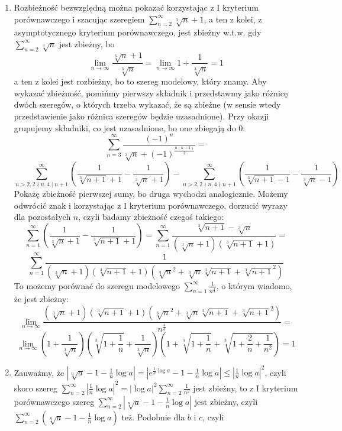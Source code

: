 \documentclass{../note}
\begin{document}
\begin{rozwiazanie}
\begin{enumerate}[label=(\alph*)]
    \item Rozbieżność bezwzględną można pokazać korzystając z I kryterium porównawczego i szacując szeregiem $\sum_{n=2}^{\infty}{\sqrt[3]{n}+1}$, a ten z kolei, z asymptotycznego kryterium porównawczego, jest zbieżny w.t.w. gdy $\sum_{n=2}^{\infty}{\sqrt[3]{n}}$ jest zbieżny, bo
    \[\lim_{n\to\infty}\frac{\sqrt[3]{n}+1}{\sqrt[3]{n}} = \lim_{n\to\infty} 1 + \frac{1}{\sqrt[3]{n}} = 1\]
    a ten z kolei jest rozbieżny, bo to szereg modelowy, który znamy. Aby wykazać zbieżność, pomińmy pierwszy składnik i przedstawmy jako różnicę dwóch szeregów, o których trzeba wykazać, że są zbieżne (w sensie wtedy przedstawienie jako różnica szeregów będzie uzasadnione). Przy okazji grupujemy składniki, co jest uzasadnione, bo one zbiegają do 0:
    \[\sum_{n=3}^{\infty}\frac{(-1)^{n}}{\sqrt[3]{n}+(-1)^{\frac{n(n+1)}{2}}} = \]\[
    \sum_{n>2, 2\nmid n, 4\mid n+1}^{\infty}\left(\frac{1}{\sqrt[3]{n+1}+1} - \frac{1}{\sqrt[3]{n}+1}\right) - 
    \sum_{n>2, 2\nmid n, 4\nmid n+1}^{\infty}\left(\frac{1}{\sqrt[3]{n+1}-1} - \frac{1}{\sqrt[3]{n}-1}\right)\]
    Pokażę zbieżność pierwszej sumy, bo druga wychodzi analogicznie. Możemy odwrócić znak i korzystając z I kryterium porównawczego, dorzucić wyrazy dla pozostałych $n$, czyli badamy zbieżność czegoś takiego:
    \[\sum_{n=1}^{\infty}\left(\frac{1}{\sqrt[3]{n}+1} - \frac{1}{\sqrt[3]{n+1}+1}\right) = \sum_{n=1}^{\infty}\frac{\sqrt[3]{n+1}-\sqrt[3]{n}}{(\sqrt[3]{n}+1)(\sqrt[3]{n+1}+1)}=\]
    \[\sum_{n=1}^{\infty}\frac{1}{(\sqrt[3]{n}+1)(\sqrt[3]{n+1}+1)(\sqrt[3]{n}^2 + \sqrt[3]{n}\sqrt[3]{n+1} + \sqrt[3]{n+1}^2)}\]
    To możemy porównać do szeregu modelowego $\sum_{n=1}^{\infty}\frac{1}{n^\frac43}$, o którym wiadomo, że jest zbieżny:
    \[\lim_{n\to\infty}\frac{(\sqrt[3]{n}+1)(\sqrt[3]{n+1}+1)(\sqrt[3]{n}^2 + \sqrt[3]{n}\sqrt[3]{n+1} + \sqrt[3]{n+1}^2)}{n^\frac43}=\]
    \[\lim_{n\to\infty}\left(1 + \frac{1}{\sqrt[3]{n}}\right)\left(\sqrt[3]{1+\frac1n} + \frac{1}{\sqrt[3]{n}}\right)\left(1 + \sqrt[3]{1+\frac1n} + \sqrt[3]{1+\frac2n+\frac1{n^2}}\right) = 1\]
    \item Zauważmy, że $|\sqrt[n]{a}-1-\frac{1}{n}\log a| = |e^{\frac{1}{n}\log a}-1-\frac{1}{n}\log a| \le |\frac{1}{n}\log a|^{2}$, czyli skoro szereg $\sum_{n=2}^{\infty} \left|\frac{1}{n}\log a\right|^{2} = |\log a|^{2}\sum_{n=2}^{\infty}\frac{1}{n^{2}}$ jest zbieżny, to z I kryterium porównawczego szereg $\sum_{n=2}^{\infty} \left|\sqrt[n]{a}-1-\frac{1}{n}\log a\right|$ jest zbieżny, czyli $\sum_{n=2}^{\infty}(\sqrt[n]{a}-1-\frac{1}{n}\log a)$ też. Podobnie dla $b$ i $c$, czyli

\end{enumerate}
\end{rozwiazanie}
\end{document}
